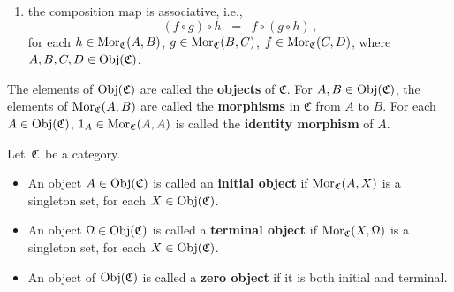 \begin{definition}[Category]
\begin{enumerate}
\item
	the composition map is associative, i.e.,
	\begin{equation*}
	(f \circ g) \circ h
	\;\; = \;\;
	f \circ (g \circ h)\,,
	\end{equation*}
	for each
	$h \in \textnormal{Mor}_{\mathfrak{C}}(A,B)$,
	$g \in \textnormal{Mor}_{\mathfrak{C}}(B,C)$,
	$f \in \textnormal{Mor}_{\mathfrak{C}}(C,D)$,\;
	where
	\,$A,B,C,D \in \textnormal{Obj}(\mathfrak{C})$.
\end{enumerate}
The elements of $\textnormal{Obj}(\mathfrak{C})$ are called the \textbf{objects} of $\mathfrak{C}$.
For $A, B \in \textnormal{Obj}(\mathfrak{C})$, the elements of  $\textnormal{Mor}_{\mathfrak{C}}(A,B)$
are called the \textbf{morphisms} in $\mathfrak{C}$ from $A$ to $B$.
For each $A \in \textnormal{Obj}(\mathfrak{C})$, $1_{A} \in \textnormal{Mor}_{\mathfrak{C}}(A,A)$ is called
the \textbf{identity morphism} of $A$.
\end{definition}


\vskip 0.5cm
\begin{definition}
\mbox{}
\vskip 0.15cm
\noindent
Let \,$\mathfrak{C}$\, be a category.
\begin{itemize}
\item
	An object $A \in \textnormal{Obj}(\mathfrak{C})$ is called an \textbf{initial object} if $\textnormal{Mor}_{\mathfrak{C}}(A,X)$ is a singleton set,
	for each $X \in \textnormal{Obj}(\mathfrak{C})$.
\item
	An object $\Omega \in \textnormal{Obj}(\mathfrak{C})$ is called a \textbf{terminal object} if $\textnormal{Mor}_{\mathfrak{C}}(X,\Omega)$ is a singleton set,
	for each $X \in \textnormal{Obj}(\mathfrak{C})$.
\item
	An object of $\textnormal{Obj}(\mathfrak{C})$ is called a \textbf{zero object} if it is both initial and terminal.
\end{itemize}
\end{definition}


